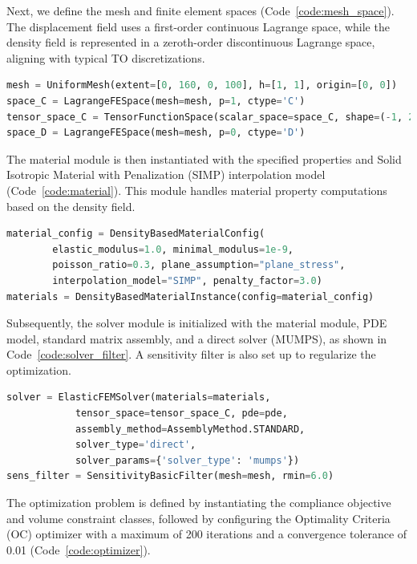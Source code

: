 \documentclass[mathpazo]{cicp}
\begin{document}
Next, we define the mesh and finite element spaces (Code~\ref{code:mesh_space}). The displacement field uses a first-order continuous Lagrange space, while the density field is represented in a zeroth-order discontinuous Lagrange space, aligning with typical TO discretizations.

\begin{lstlisting}[language=python, caption={Mesh and function space definitions}, label={code:mesh_space}]
mesh = UniformMesh(extent=[0, 160, 0, 100], h=[1, 1], origin=[0, 0])
space_C = LagrangeFESpace(mesh=mesh, p=1, ctype='C')
tensor_space_C = TensorFunctionSpace(scalar_space=space_C, shape=(-1, 2))
space_D = LagrangeFESpace(mesh=mesh, p=0, ctype='D')
\end{lstlisting}

The material module is then instantiated with the specified properties and Solid Isotropic Material with Penalization (SIMP) interpolation model (Code~\ref{code:material}). This module handles material property computations based on the density field.

\begin{lstlisting}[language=python, caption={Material module}, label={code:material}]
material_config = DensityBasedMaterialConfig(
		elastic_modulus=1.0, minimal_modulus=1e-9, 
		poisson_ratio=0.3, plane_assumption="plane_stress",  
		interpolation_model="SIMP", penalty_factor=3.0)
materials = DensityBasedMaterialInstance(config=material_config)
\end{lstlisting}

Subsequently, the solver module is initialized with the material module, PDE model, standard matrix assembly, and a direct solver (MUMPS), as shown in Code~\ref{code:solver_filter}. A sensitivity filter is also set up to regularize the optimization.

\begin{lstlisting}[language=python, caption={Solver and filter module}, label={code:solver_filter}] 
solver = ElasticFEMSolver(materials=materials,
			tensor_space=tensor_space_C, pde=pde,
			assembly_method=AssemblyMethod.STANDARD,
			solver_type='direct',
			solver_params={'solver_type': 'mumps'})
sens_filter = SensitivityBasicFilter(mesh=mesh, rmin=6.0)
\end{lstlisting}

The optimization problem is defined by instantiating the compliance objective and volume constraint classes, followed by configuring the Optimality Criteria (OC) optimizer with a maximum of 200 iterations and a convergence tolerance of 0.01 (Code~\ref{code:optimizer}).
\end{document}
